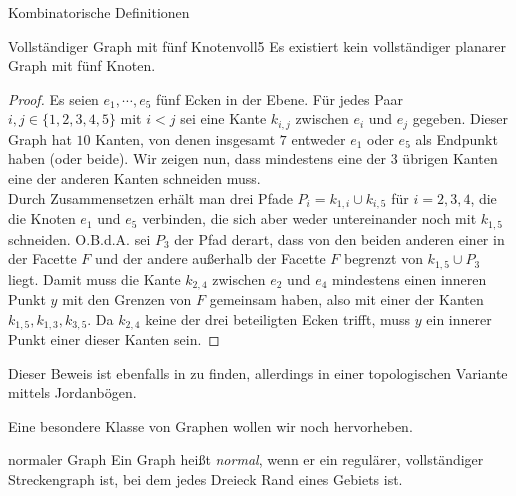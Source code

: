 \begin{section}{Kombinatorische Definitionen}
  
  \begin{satzl}{Vollständiger Graph mit fünf Knoten}{voll5}
   Es existiert kein vollständiger planarer Graph mit fünf Knoten.
  \end{satzl}
  \begin{proof}
    Es seien $e_1,\cdots,e_5$ fünf Ecken in der Ebene. Für jedes Paar $i,j \in \{1,2,3,4,5\}$ mit $i < j$ sei eine Kante $k_{i,j}$ zwischen $e_i$ und $e_j$ gegeben. Dieser Graph hat $10$ Kanten, von denen insgesamt $7$ entweder $e_1$ oder $e_5$ als Endpunkt haben (oder beide). Wir zeigen nun, dass mindestens eine der $3$ übrigen Kanten eine der anderen Kanten schneiden muss.\\
    Durch Zusammensetzen erhält man drei Pfade $P_i = k_{1,i} \cup k_{i,5}$ für $i = 2,3,4$, die die Knoten $e_1$ und $e_5$ verbinden, die sich aber weder untereinander noch mit $k_{1,5}$ schneiden. O.B.d.A. sei $P_3$ der Pfad derart, dass von den beiden anderen einer in der Facette $F$ und der andere außerhalb der Facette $F$ begrenzt von $k_{1,5} \cup P_3$ liegt. Damit muss die Kante $k_{2,4}$ zwischen $e_2$ und $e_4$ mindestens einen inneren Punkt $y$ mit den Grenzen von $F$ gemeinsam haben, also mit einer der Kanten $k_{1,5},k_{1,3},k_{3,5}$. Da $k_{2,4}$ keine der drei beteiligten Ecken trifft, muss $y$ ein innerer Punkt einer dieser Kanten sein.
  \end{proof}
  
  Dieser Beweis ist ebenfalls in \cite[Satz 4.1.2]{fritsch} zu finden, allerdings in einer topologischen Variante mittels Jordanbögen. 
  
  Eine besondere Klasse von Graphen wollen wir noch hervorheben.
  
  \begin{definition}{normaler Graph}
   Ein Graph heißt \textit{normal}, wenn er ein regulärer, vollständiger Streckengraph ist, bei dem jedes Dreieck Rand eines Gebiets ist.
  \end{definition}
\end{section}